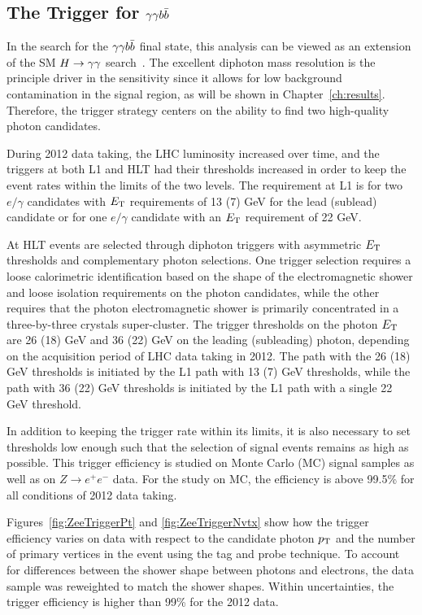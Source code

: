 \subsection{The Trigger for $\gamma\gamma b\bar{b}$}

In the search for the $\gamma\gamma b\bar{b}$ final state, this analysis can be viewed as an extension of the
SM $H\to\gamma\gamma$ search~\cite{HggCMSpaper}. The excellent diphoton mass
resolution is the principle driver in the sensitivity since it allows for low background contamination
in the signal region, as will be shown in Chapter~\ref{ch:results}.
Therefore, the trigger strategy centers on the ability to find two high-quality photon candidates.

During 2012 data taking, the LHC luminosity increased over time, and the triggers at both L1 and HLT
had their thresholds increased in order to keep the event rates within the limits of the two levels.
The requirement at L1 is for two $e/\gamma$ candidates with $E_{\rm T}$ requirements of 13 (7) GeV
for the lead (sublead) candidate or for one $e/\gamma$ candidate with an $E_{\rm T}$ requirement of
22 GeV.

At HLT events are selected through diphoton triggers with asymmetric $E_{\rm T}$ thresholds
and complementary photon selections. One trigger selection requires a loose calorimetric
identification based on the shape of the electromagnetic shower and loose isolation requirements
on the photon candidates, while the other requires that the photon electromagnetic shower
is primarily concentrated in a three-by-three crystals super-cluster.
The trigger thresholds on the photon $E_{\rm T}$ are 26 (18) GeV and 36 (22) GeV on the leading
(subleading) photon, depending on the acquisition period of LHC data taking in 2012.
The path with the 26 (18) GeV thresholds is initiated by the L1 path with 13 (7) GeV thresholds, while
the path with 36 (22) GeV thresholds is initiated by the L1 path with a single 22 GeV threshold.

In addition to keeping the trigger rate within its limits, it is also necessary to set thresholds
low enough such that the selection of signal events remains as high as possible. This trigger efficiency
is studied on Monte Carlo (MC) signal samples as well as on $Z\rightarrow e^+ e^-$ data.
For the study on MC, the efficiency is above 99.5\% for all conditions of 2012 data taking.

Figures~\ref{fig:ZeeTriggerPt} and \ref{fig:ZeeTriggerNvtx}
show how the trigger efficiency varies on data with respect to the
candidate photon $p_{\rm T}$ and the number of primary vertices in the event
using the tag and probe technique. To account for differences
between the shower shape between photons and electrons, the data sample was reweighted to match the
shower shapes. Within uncertainties, the trigger efficiency is higher than 99\% for the 2012 data.

